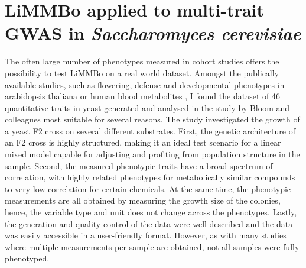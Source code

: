 \chapter{LiMMBo applied to multi-trait GWAS  in \emph{Saccharomyces cerevisiae}}
The often large number of phenotypes measured in cohort studies offers the possibility to test LiMMBo on a real world dataset. Amongst the publically available studies, such as flowering, defense and developmental phenotypes in arabidopsis thaliana \citep{Atwell2010} or human blood metabolites \citep{Shin2014}, I found the dataset of 46 quantitative traits in yeast generated and analysed in the study by Bloom and colleagues \citep{Bloom2013} most suitable for several reasons. The study investigated the growth of a yeast F2 cross on several different substrates. First, the genetic architecture of an F2 cross is highly structured, making it an ideal test scenario for a linear mixed model capable for adjusting and profiting from population structure in the sample. Second, the measured phenotypic traits have a broad spectrum of correlation, with highly related phenotypes for metabolically similar compounds to very low correlation for certain chemicals. At the same time, the phenotypic measurements are all obtained by measuring the growth size of the colonies, hence, the variable type and unit does not change across the phenotypes. Lastly, the generation and quality control of the data were well described and the data was easily accessible in a user-friendly format. However, as with many studies where multiple measurements per sample are obtained, not all samples were fully phenotyped. 

